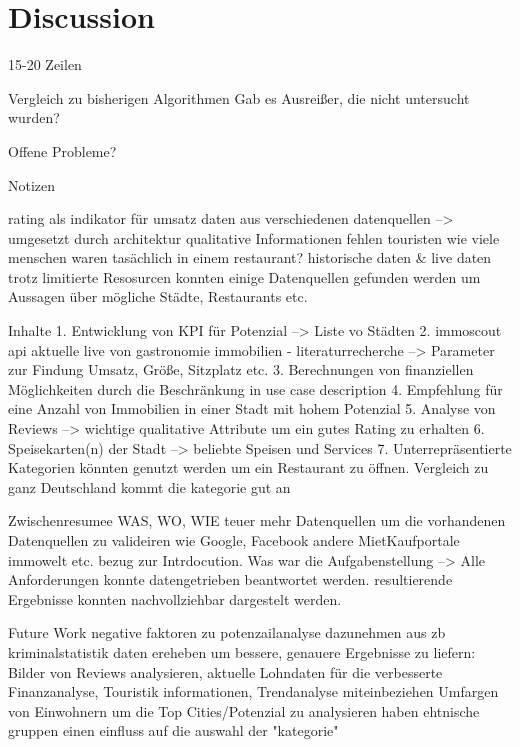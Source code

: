 \section{Discussion}
\label{sec:discussion}

15-20 Zeilen

Vergleich zu bisherigen Algorithmen
Gab es Ausreißer, die nicht untersucht wurden?

Offene Probleme?

Notizen

rating als indikator für umsatz
daten aus verschiedenen datenquellen --> umgesetzt durch architektur
qualitative Informationen fehlen
touristen
wie viele menschen waren tasächlich in einem restaurant?
historische daten & live daten
trotz limitierte Resosurcen konnten einige Datenquellen gefunden werden um Aussagen über mögliche Städte, Restaurants etc.

Inhalte
1. Entwicklung von KPI für Potenzial --> Liste vo Städten
2. immoscout api aktuelle live von gastronomie immobilien
    - literaturrecherche --> Parameter zur Findung Umsatz, Größe, Sitzplatz etc.
3. Berechnungen von finanziellen Möglichkeiten durch die Beschränkung in use case description
4. Empfehlung für eine Anzahl von Immobilien in einer Stadt mit hohem Potenzial
5. Analyse von Reviews --> wichtige qualitative Attribute um ein gutes Rating zu erhalten
6. Speisekarten(n) der Stadt --> beliebte Speisen und Services
7. Unterrepräsentierte Kategorien könnten genutzt werden um ein Restaurant zu öffnen.
  Vergleich zu ganz Deutschland kommt die kategorie gut an

Zwischenresumee
WAS, WO, WIE teuer
mehr Datenquellen um die vorhandenen Datenquellen zu valideiren wie Google, Facebook andere MietKaufportale immowelt etc.
bezug zur Intrdocution. Was war die Aufgabenstellung --> Alle Anforderungen konnte datengetrieben beantwortet werden.
resultierende Ergebnisse konnten nachvollziehbar dargestelt werden.

Future Work
negative faktoren zu potenzailanalyse dazunehmen aus zb kriminalstatistik
daten ereheben um bessere, genauere Ergebnisse zu liefern:
Bilder von Reviews analysieren, aktuelle Lohndaten für die verbesserte Finanzanalyse, Touristik informationen, Trendanalyse miteinbeziehen
Umfargen von Einwohnern um die Top Cities/Potenzial zu analysieren
haben ehtnische gruppen einen einfluss auf die auswahl der "kategorie"
